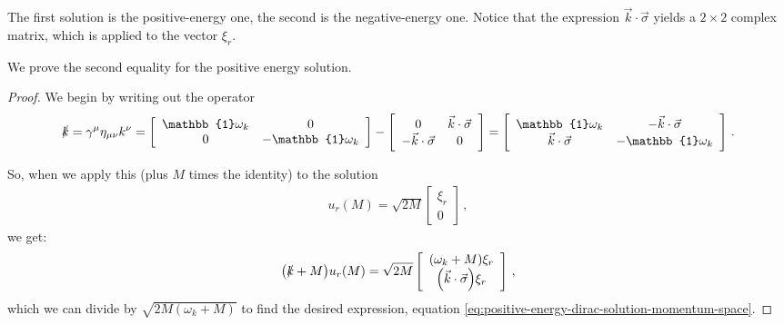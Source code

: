 \documentclass[main.tex]{subfiles}
\begin{document}
The first solution is the positive-energy one, the second is the negative-energy one. 
Notice that the expression \(\vec{k} \cdot \vec{\sigma}\) yields a \(2 \times 2\) complex matrix, which is applied to the vector \(\xi_{r}\).

We prove the second equality for the positive energy solution. 

\begin{proof}
We begin by writing out the operator 
%
\begin{subequations}
\begin{align}
\slashed{k}  = \gamma^{\mu } \eta_{\mu \nu } k^{\nu }
= \left[\begin{array}{cc}
\mathbb{1} \omega_{k} & 0 \\ 
0 & -\mathbb{1} \omega_{k}
\end{array}\right]
- 
\left[\begin{array}{cc}
0 & \vec{k} \cdot \vec{\sigma} \\ 
-\vec{k} \cdot \vec{\sigma} & 0
\end{array}\right]
= \left[\begin{array}{cc}
\mathbb{1} \omega_{k} & -\vec{k} \cdot \vec{\sigma} \\ 
\vec{k} \cdot \vec{\sigma} & - \mathbb{1} \omega_{k}
\end{array}\right]
\,.
\end{align}
\end{subequations}

So, when we apply this (plus \(M\) times the identity) to the solution 
%
\begin{subequations}
\begin{align}
u_r(M) = \sqrt{2M} \left[\begin{array}{c}
\xi_{r} \\ 
0
\end{array}\right]
\,,
\end{align}
\end{subequations}
%
we get: 
%
\begin{subequations}
\begin{align}
\qty(\slashed{k} + M) u_{r}(M) = 
\sqrt{2M} \left[\begin{array}{c}
\qty(\omega_{k} + M)  \xi_{r} \\ 
\qty(\vec{k} \cdot \vec{\sigma}) \xi_{r}
\end{array}\right]
\,,
\end{align}
\end{subequations}
%
which we can divide by \(\sqrt{2M (\omega_{k} + M)}\) to find the desired expression, equation \eqref{eq:positive-energy-dirac-solution-momentum-space}.
\end{proof}
\end{document}
